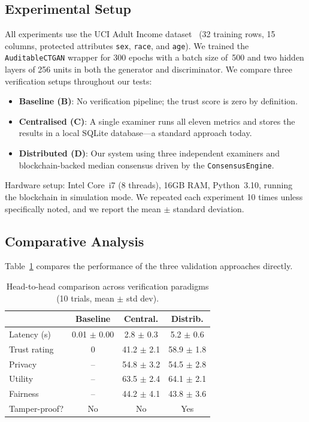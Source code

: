 
\subsection{Experimental Setup}

All experiments use the UCI Adult Income dataset~\cite{dua2019uci} (32 training rows, 15 columns, protected attributes \texttt{sex}, \texttt{race}, and \texttt{age}). We trained the \texttt{AuditableCTGAN} wrapper for 300 epochs with a batch size of~500 and two hidden layers of 256 units in both the generator and discriminator. We compare three verification setups throughout our tests:

\begin{itemize}[leftmargin=*, itemsep=1pt]
  \item \textbf{Baseline (B)}: No verification pipeline; the trust score is zero by definition.
  \item \textbf{Centralised (C)}: A single examiner runs all eleven metrics and stores the results in a local SQLite database---a standard approach today.
  \item \textbf{Distributed (D)}: Our system using three independent examiners and blockchain-backed median consensus driven by the \texttt{ConsensusEngine}.
\end{itemize}

Hardware setup: Intel Core~i7 (8 threads), 16\thinspace GB RAM, Python~3.10, running the blockchain in simulation mode. We repeated each experiment 10 times unless specifically noted, and we report the mean $\pm$ standard deviation.

\subsection{Comparative Analysis}

Table~\ref{tab:comparative} compares the performance of the three validation approaches directly.

\begin{table}[h]
\centering
\caption{Head-to-head comparison across verification paradigms (10 trials, mean $\pm$ std dev).}
\label{tab:comparative}
\begin{tabular}{lccc}
\toprule
 & \textbf{Baseline} & \textbf{Central.} & \textbf{Distrib.} \\
\midrule
Latency (s) & 0.01 $\pm$ 0.00 & 2.8 $\pm$ 0.3 & 5.2 $\pm$ 0.6 \\
Trust rating & 0 & 41.2 $\pm$ 2.1 & 58.9 $\pm$ 1.8 \\
Privacy & -- & 54.8 $\pm$ 3.2 & 54.5 $\pm$ 2.8 \\
Utility & -- & 63.5 $\pm$ 2.4 & 64.1 $\pm$ 2.1 \\
Fairness & -- & 44.2 $\pm$ 4.1 & 43.8 $\pm$ 3.6 \\
Tamper-proof? & No & No & Yes \\
\bottomrule
\end{tabular}
\end{table}

